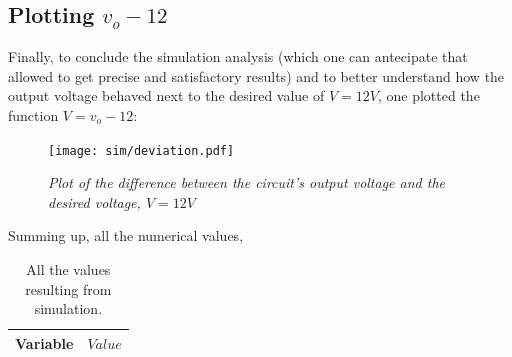 \subsection{Plotting $v_o - 12$}
Finally, to conclude the simulation analysis (which one can antecipate that allowed to get precise and satisfactory results) and to better understand how the output voltage behaved next to the desired value of $V = 12V$, one plotted the function $V = v_o - 12$:

\vspace{-140px}
\begin{figure}[H]
    \centering
    \texttt{[image: sim/deviation.pdf]}
    \vspace*{-10mm}
        \caption{\textit{Plot of the difference between the circuit's output voltage and the desired voltage, $V=12V$}}
    \label{fig:dev}
\end{figure}

Summing up, all the numerical values,

\begin{table}[H]
    \centering
    \small
    \begin{tabular}{|c|c|}
          \hline
          Variable & $Value$\\
          \hline
          
          \hline
    \end{tabular}
    \caption{All the values resulting from simulation.}
    \label{tab:all}
    \end{table}

